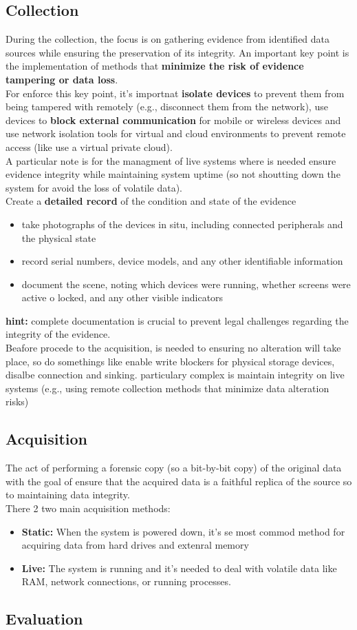 \subsection{Collection}
During the collection, the focus is on gathering evidence from identified data sources while ensuring the preservation of its integrity. An important key point is the implementation of methods that \textbf{minimize the risk of evidence tampering or data loss}. \\
For enforce this key point, it's importnat \textbf{isolate devices} to prevent them from being tampered with remotely (e.g., disconnect them from the network), use devices to \textbf{block external
communication} for mobile or wireless devices and use network isolation tools for virtual and cloud environments to prevent remote access (like use a virtual private cloud). \\
A particular note is for the managment of live systems where is needed ensure evidence integrity while
maintaining system uptime (so not shoutting down the system for avoid the loss of volatile data). \\
Create a \textbf{detailed record} of the condition and state of the evidence
\begin{itemize}[itemsep=0pt]
    \item take photographs of the devices in situ, including connected peripherals and the physical state
    \item  record serial numbers, device models, and any other identifiable information
    \item  document the scene, noting which devices were running, whether screens were active o locked, and any other visible indicators
\end{itemize}
\textbf{hint:} complete documentation is crucial to prevent legal challenges regarding the integrity of the evidence. \\
Beafore procede to the acquisition, is needed to ensuring no alteration will take place, so do somethings like enable write blockers for physical storage devices, disalbe connection and sinking. particulary complex is maintain  integrity on live systems (e.g., using remote collection methods that minimize data alteration risks)


\subsection{Acquisition}
The act of performing a forensic copy (so a bit-by-bit copy) of the original data with the goal of ensure that the acquired data is a faithful replica of the source so to maintaining data integrity. \\
There 2 two main acquisition methods:
\begin{itemize}
    \item \textbf{Static:} When the system is powered down, it's se most commod method for acquiring data from hard drives and extenral memory
    \item \textbf{Live:} The system is running and it's needed to deal with volatile data like RAM, network connections, or running processes.
\end{itemize} 


\subsection{Evaluation}

